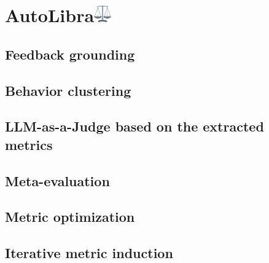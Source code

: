 \section{AutoLibra\protect\includegraphics[height=1em]{figs/scale.png}}

\subsection{Feedback grounding}
\label{sec:grounding}

\subsection{Behavior clustering}
\label{sec:clustering}

\subsection{LLM-as-a-Judge based on the extracted metrics}
\label{sec:llm-judge}

\subsection{Meta-evaluation}
\label{sec:meta-evaluation}

\subsection{Metric optimization}
\label{sec:metric-optimization}

\subsection{Iterative metric induction}
\label{sec:iterative-induction}